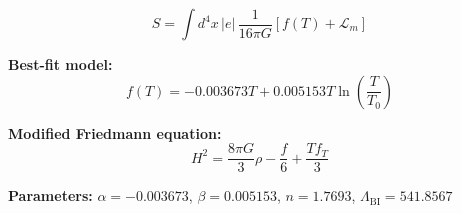 
\begin{equation}
  S = \int d^4x \, |e| \, \frac{1}{16\pi G} \left[ f(T) + \mathcal{L}_m \right]
\end{equation}

\textbf{Best-fit model:}
\begin{equation}
  f(T) = -0.003673 T + 0.005153 T \ln\!\left(\frac{T}{T_0}\right)
\end{equation}

\textbf{Modified Friedmann equation:}
\begin{equation}
  H^2 = \frac{8\pi G}{3} \rho - \frac{f}{6} + \frac{T f_T}{3}
\end{equation}

\textbf{Parameters:}
$\alpha = -0.003673$, \quad
$\beta = 0.005153$, \quad
$n = 1.7693$, \quad
$\Lambda_{\text{BI}} = 541.8567$